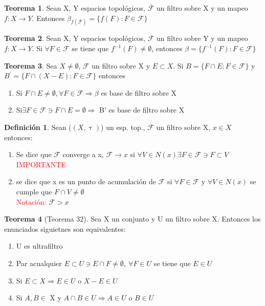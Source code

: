 \documentclass{article}
\theoremstyle{definition}
\newtheorem{definition}{Definición}[section]
\newtheorem{theorem}{Teorema}[section]
\begin{document}
\begin{theorem}
	Sean X, Y espacios topológicos, $\overline{\mathcal{F}}$ un filtro sobre X y un mapeo $f:X\to Y$. Entonces $\beta_{f(\overline{\mathcal{F}})}=\{f(F):F\in \mathcal{F}\}$
\end{theorem}
\begin{theorem}
	Sean X, Y espacios topológicos, $\mathcal{F}$ un filtro sobre Y y un mapeo $f:X\to Y$. Si $\forall F\in \mathcal{F}$ se tiene que $f^{-1}(F)\neq\emptyset$, entonces $\beta=\{f^{-1}(F):F\in \mathcal{F}\}$
\end{theorem}
\begin{theorem}
	Sea $X\neq\emptyset$, $\mathcal{F}$ un filtro sobre X y $E\subset X$. Si $B=\{F\cap E: F\in \mathcal{F}\}$ 
y $B^{'}=\{F\cap (X-E): F\in \mathcal{F}\}$ entonces 
	\begin{enumerate}
		\item Si $F\cap E\neq \emptyset, \forall F\in \mathcal{F}\Rightarrow \beta$ es base de filtro sobre X
		\item Si$\exists F\in \mathcal{F}\ni F\cap E = \emptyset \Rightarrow$ B' es base de filtro sobre X 
	\end{enumerate}
\end{theorem}
\begin{definition}
	Sean ($(X,\uptau)$) un esp. top., $\mathcal{F}$ un filtro sobre X, $x\in X$ entonces:
	\begin{enumerate}
		\item Se dice que $\mathcal{F}$ converge a x, $\mathcal{F}\to x$ si $\forall V\in N(x)\exists F\in \mathcal{F}\ni F\subset V$\textcolor{red}{IMPORTANTE}
		\item se dice que x es un punto de acumulación de $\mathcal{F}$ si $\forall F\in \mathcal{F}$ y $\forall V\in N(x)$ se cumple que $F\cap V\neq \emptyset$\\
		\textcolor{red}{Notación: } $\mathcal{F}>x$
	\end{enumerate}
\end{definition}
\begin{theorem}[Teorema 32]
	Sea X un conjunto y U un filtro sobre X. Entonces los enunciados siguietnes son equivalentes:
	\begin{enumerate}
		\item U es ultrafiltro
		\item Par acualquier $E\subset U\ni E\cap F\neq \emptyset,\ \forall F\in U$ se tiene que $E\in U$
		\item Si $E\subset X\Rightarrow E\in U$ o $X-E\in U$
		\item Si $A, B\in$ X y $ A\cap B\in U\Rightarrow A\in U$ o $ B\in U$
	\end{enumerate}
\end{theorem}
\end{document}

